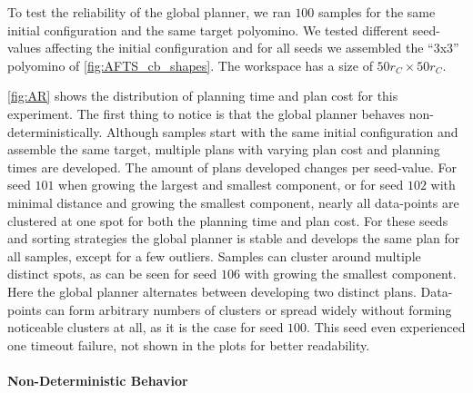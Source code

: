 To test the reliability of the global planner, we ran $100$ samples for the same initial configuration and the same target polyomino.
We tested different seed-values affecting the initial configuration and for all seeds we assembled the ``3x3'' polyomino of \autoref{fig:AFTS_cb_shapes}.
The workspace has a size of $50 r_C \times 50 r_C$.

\autoref{fig:AR} shows the distribution of planning time and plan cost for this experiment.
The first thing to notice is that the global planner behaves non-deterministically.
Although samples start with the same initial configuration and assemble the same target, multiple plans with varying plan cost and planning times are developed.
The amount of plans developed changes per seed-value.
For seed $101$ when growing the largest and smallest component, or for seed $102$ with minimal distance and growing the smallest component, nearly all data-points are clustered at one spot for both the planning time and plan cost.
For these seeds and sorting strategies the global planner is stable and develops the same plan for all samples, except for a few outliers.
Samples can cluster around multiple distinct spots, as can be seen for seed $106$ with growing the smallest component.
Here the global planner alternates between developing two distinct plans.
Data-points can form arbitrary numbers of clusters or spread widely without forming noticeable clusters at all, as it is the case for seed $100$.
This seed even experienced one timeout failure, not shown in the plots for better readability. 

\paragraph{Non-Deterministic Behavior}

